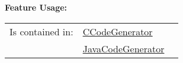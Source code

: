 	\begingroup
	\textbf{Feature Usage:}
	\renewcommand{\arraystretch}{1.8} %
	\begin{longtable}{l|l p{}}
		\hline
	Is contained in: & \tabitem \hyperlink{ref:CCodeGenerator}{CCodeGenerator}  & \\
	& \tabitem \hyperlink{ref:JavaCodeGenerator}{JavaCodeGenerator}  &  \\
	\hline
	\end{longtable}
	\endgroup
		
	
	\vspace{\baselineskip}
	\vspace{\baselineskip}
	\vspace{\baselineskip}
	
